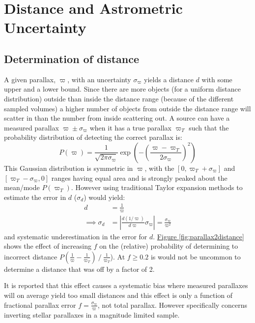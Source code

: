 \section{Distance and Astrometric Uncertainty}	\label{sec:distancecalibration}
	\subsection{Determination of distance}
		A given parallax, $\varpi$, with an uncertainty $\sigma_\varpi$ yields a distance $d$ with some upper and a lower bound. Since there are more objects (for a uniform distance distribution) outside than inside the distance range (because of the different sampled volumes) a higher number of objects from outside the distance range will scatter in than the number from inside scattering out. A source can have a measured parallax $\varpi\pm\sigma_\varpi$ when it has a true parallax $\varpi_T$ such that the probability distribution of detecting the correct parallax is:
		\begin{equation*}
		P(\varpi)=\frac{1}{\sqrt{2\pi\sigma_\varpi}}\exp{\left(-\left(\frac{\varpi-\varpi_T}{2{\sigma_\varpi}}\right)^2\right)}
		\end{equation*} 
		This Gaussian distribution is symmetric in $\varpi$, with the $[0, \varpi_T+\sigma_\varpi]$ and $[ \varpi_T-\sigma_\varpi,0]$ ranges having equal area and is strongly peaked about the mean/mode $P(\varpi_T)$. However using traditional Taylor expansion methods to estimate the error in $d$ ($\sigma_d$) would yield:
		\begin{align*}
		d &= \frac{1}{\varpi} \\
		\implies\sigma_d&=\left|\frac{d(1/\varpi)}{d\varpi}\sigma_\varpi\right|=\frac{\sigma_\varpi}{\varpi^2}
		\end{align*} and systematic underestimation in the error for $d$. \hyperref[fig:parallax2distance]{Figure \ref*{fig:parallax2distance}} shows the effect of increasing $f$ on the (relative) probability of determining to incorrect distance $P\left(\frac{1}{\varpi}-\frac{1}{\varpi_T}\right)~/~\frac{1}{\varpi_T}$). At $f\ge0.2$ is would not be uncommon to determine a distance that was off by a factor of 2.
		
		It is reported that this effect causes a systematic bias where measured parallaxes will on average yield too small distances \citep{LutzKelker1973} and this effect is only a function of fractional parallax error $f=\frac{\sigma_\varpi}{\varpi}$, not total parallax. However \citet{LutzKelker1973} specifically concerns inverting stellar parallaxes in a magnitude limited sample. 
		
